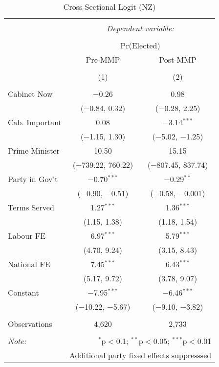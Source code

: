 
\begin{table}[!htb] \centering 
  \caption{Cross-Sectional Logit (NZ)} 
  \label{} 
\begin{tabular}{@{\extracolsep{5pt}}lcc} 
\\[-1.8ex]\hline 
\hline \\[-1.8ex] 
 & \multicolumn{2}{c}{\textit{Dependent variable:}} \\ 
\cline{2-3} 
\\[-1.8ex] & \multicolumn{2}{c}{Pr(Elected)} \\ 
 & Pre-MMP & Post-MMP \\ 
\\[-1.8ex] & (1) & (2)\\ 
\hline \\[-1.8ex] 
 Cabinet Now & $-$0.26 & 0.98 \\ 
  & ($-$0.84, 0.32) & ($-$0.28, 2.25) \\ 
  Cab. Important & 0.08 & $-$3.14$^{***}$ \\ 
  & ($-$1.15, 1.30) & ($-$5.02, $-$1.25) \\ 
  Prime Minister & 10.50 & 15.15 \\ 
  & ($-$739.22, 760.22) & ($-$807.45, 837.74) \\ 
  Party in Gov't & $-$0.70$^{***}$ & $-$0.29$^{**}$ \\ 
  & ($-$0.90, $-$0.51) & ($-$0.58, $-$0.001) \\ 
  Terms Served & 1.27$^{***}$ & 1.36$^{***}$ \\ 
  & (1.15, 1.38) & (1.18, 1.54) \\ 
  Labour FE & 6.97$^{***}$ & 5.79$^{***}$ \\ 
  & (4.70, 9.24) & (3.15, 8.43) \\ 
  National FE & 7.45$^{***}$ & 6.43$^{***}$ \\ 
  & (5.17, 9.72) & (3.78, 9.07) \\ 
  Constant & $-$7.95$^{***}$ & $-$6.46$^{***}$ \\ 
  & ($-$10.22, $-$5.67) & ($-$9.10, $-$3.82) \\ 
 \hline \\[-1.8ex] 
Observations & 4,620 & 2,733 \\ 
\hline 
\hline \\[-1.8ex] 
\textit{Note:}  & \multicolumn{2}{r}{$^{*}$p$<$0.1; $^{**}$p$<$0.05; $^{***}$p$<$0.01} \\ 
 & \multicolumn{2}{r}{Additional party fixed effects suppresssed} \\ 
\end{tabular} 
\end{table} 
